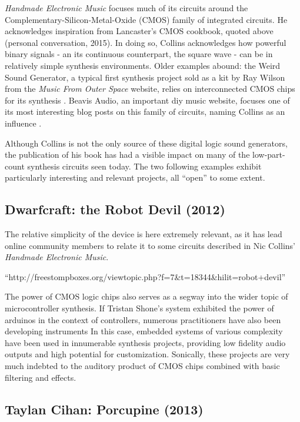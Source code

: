 \emph{Handmade Electronic Music} focuses much of its circuits around the Complementary-Silicon-Metal-Oxide (CMOS) family of integrated circuits. He acknowledges inspiration from Lancaster's CMOS cookbook, quoted above (personal conversation, 2015). In doing so, Collins acknowledges how powerful binary signals - an its continuous counterpart, the square wave - can be in relatively simple synthesis environments. Older examples abound: the Weird Sound Generator, a typical first synthesis project sold as a kit by Ray Wilson from the \emph{Music From Outer Space} website, relies on interconnected CMOS chips for its synthesis \citep{wilson2015}. Beavis Audio, an important diy music website, focuses one of its most interesting blog posts on this family of circuits, naming Collins as an influence \citep{beavis2015}. 

Although Collins is not the only source of these digital logic sound generators, the publication of his book has had a visible impact on many of the low-part-count synthesis circuits seen today. The two following examples exhibit particularly interesting and relevant projects, all ``open'' to some extent. 

\subsection{Dwarfcraft: the Robot Devil (2012)}

The relative simplicity of the device is here extremely relevant, as it has lead online community members to relate it to some circuits described in Nic Collins' \emph{Handmade Electronic Music}. 

``http://freestompboxes.org/viewtopic.php?f=7&t=18344&hilit=robot+devil''

The power of CMOS logic chips also serves as a segway into the wider topic of microcontroller synthesis. If Tristan Shone's system exhibited the power of arduinos in the context of controllers, numerous practitioners have also been developing instruments  In this case, embedded systems of various complexity have been used in innumerable synthesis projects, providing low fidelity audio outputs and high potential for customization. Sonically, these projects are very much indebted to the auditory product of CMOS chips combined with basic filtering and effects. 

\subsection{Taylan Cihan: Porcupine (2013)}

